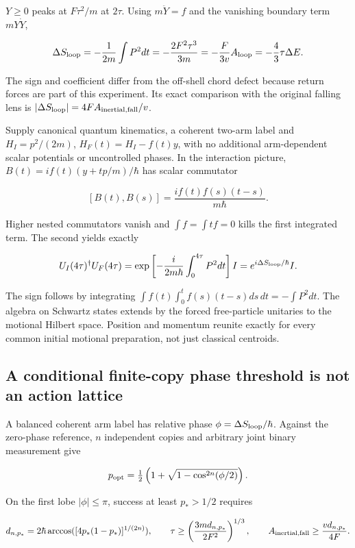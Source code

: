 \documentclass[11pt,a4paper]{article}
\begin{document}
\(Y\ge0\) peaks at \(F\tau^2/m\) at \(2\tau\). Using \(m\ddot Y=f\) and
the vanishing boundary term \(mY\dot Y\),

\[\Delta S_{\rm loop}=-\frac1{2m}\int P^2dt
 =-\frac{2F^2\tau^3}{3m}=-\frac F{3v}A_{\rm loop}
 =-\frac43\tau\Delta E.\]

The sign and coefficient differ from the off-shell chord defect because
return forces are part of this experiment. Its exact comparison with the
original falling lens is
\(|\Delta S_{\rm loop}|=4FA_{\rm inertial,fall}/v\).

Supply canonical quantum kinematics, a coherent two-arm label and
\(H_I=p^2/(2m)\), \(H_F(t)=H_I-f(t)y\), with no additional arm-dependent
scalar potentials or uncontrolled phases. In the interaction picture,
\(B(t)=if(t)(y+tp/m)/\hbar\) has scalar commutator

\[[B(t),B(s)]=\frac{if(t)f(s)(t-s)}{m\hbar}.\]

Higher nested commutators vanish and \(\int f=\int tf=0\) kills the
first integrated term. The second yields exactly

\[U_I(4\tau)^\dagger U_F(4\tau)
 =\exp\left[-\frac{i}{2m\hbar}\int_0^{4\tau}P^2dt\right]I
 =e^{i\Delta S_{\rm loop}/\hbar}I.\]

The sign follows by integrating
\(\int f(t)\int_0^tf(s)(t-s)ds\,dt=-\int P^2dt\). The algebra on
Schwartz states extends by the forced free-particle unitaries to the
motional Hilbert space. Position and momentum reunite exactly for every
common initial motional preparation, not just classical centroids.

\subsection{A conditional finite-copy phase threshold is not an action
lattice}\label{a-conditional-finite-copy-phase-threshold-is-not-an-action-lattice}

A balanced coherent arm label has relative phase
\(\phi=\Delta S_{\rm loop}/\hbar\). Against the zero-phase reference,
\(n\) independent copies and arbitrary joint binary measurement give

\[p_{\rm opt}=\tfrac12\left(1+\sqrt{1-\cos^{2n}(\phi/2)}\right).\]

On the first lobe \(|\phi|\le\pi\), success at least \(p_*>1/2\)
requires

\[d_{n,p_*}=2\hbar\arccos([4p_*(1-p_*)]^{1/(2n)}),\qquad
\tau\ge\left(\frac{3m d_{n,p_*}}{2F^2}\right)^{1/3},\qquad
A_{\rm inertial,fall}\ge\frac{v d_{n,p_*}}{4F}.\]
\end{document}
